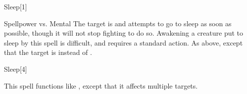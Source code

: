 \begin{spellsection}{Sleep}[1]
    \begin{spellheader}
    \end{spellheader}
    \begin{spellcontent}
        \begin{spelltargetinginfo}
        \end{spelltargetinginfo}
        \begin{spelleffects}
            \begin{spellattack}{Spellpower vs. Mental}
                \spellsuccess The target is \fatigued and attempts to go to sleep as soon as possible, though it will not stop fighting to do so. Awakening a creature put to sleep by this spell is difficult, and requires a standard action.
                \spellcritical As above, except that the target is \exhausted instead of \fatigued.
            \end{spellattack}
            \spelldur \durshort
        \end{spelleffects}
    \end{spellcontent}
    \begin{spellfooter}
        \miscastrandom
    \end{spellfooter}
\end{spellsection}

\begin{spellsection}[Mass]{Sleep}[4]
    \begin{spellheader}
    \end{spellheader}
    \begin{spellcontent}
        \begin{spelltargetinginfo}
        \end{spelltargetinginfo}
        \begin{spelleffects}
            \spellspecial This spell functions like , except that it affects multiple targets.
        \end{spelleffects}
    \end{spellcontent}
    \begin{spellfooter}
        \miscastexplode
    \end{spellfooter}
\end{spellsection}

